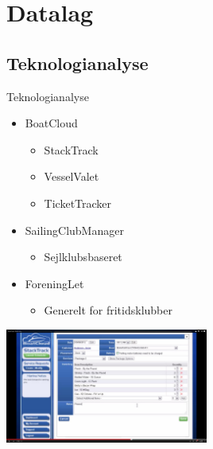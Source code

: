 \section{Datalag}
\subsection{Teknologianalyse}

\begin{frame}{Teknologianalyse}
  \begin{itemize}
    \item BoatCloud
    \begin{itemize}
      \item StackTrack
      \item VesselValet
      \item TicketTracker
    \end{itemize}
    \item SailingClubManager
    \begin{itemize}
      \item Sejlklubsbaseret
    \end{itemize}
    \item ForeningLet
    \begin{itemize}
      \item Generelt for fritidsklubber
    \end{itemize}
  \end{itemize}
\includegraphics[width=0.5\textwidth]{images/StackTrack.jpg}
\end{frame}

